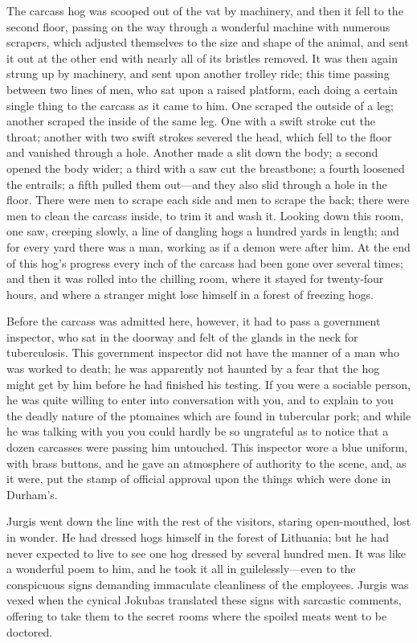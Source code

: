 \documentclass[
]{article}
\begin{document}
The carcass hog was scooped out of the vat by machinery, and then it fell to the second floor, passing on the way through a wonderful machine with numerous scrapers, which adjusted themselves to the size and shape of the animal, and sent it out at the other end with nearly all of its bristles removed. It was then again strung up by machinery, and sent upon another trolley ride; this time passing between two lines of men, who sat upon a raised platform, each doing a certain single thing to the carcass as it came to him. One scraped the outside of a leg; another scraped the inside of the same leg. One with a swift stroke cut the throat; another with two swift strokes severed the head, which fell to the floor and vanished through a hole. Another made a slit down the body; a second opened the body wider; a third with a saw cut the breastbone; a fourth loosened the entrails; a fifth pulled them out---and they also slid through a hole in the floor. There were men to scrape each side and men to scrape the back; there were men to clean the carcass inside, to trim it and wash it. Looking down this room, one saw, creeping slowly, a line of dangling hogs a hundred yards in length; and for every yard there was a man, working as if a demon were after him. At the end of this hog's progress every inch of the carcass had been gone over several times; and then it was rolled into the chilling room, where it stayed for twenty-four hours, and where a stranger might lose himself in a forest of freezing hogs.

Before the carcass was admitted here, however, it had to pass a government inspector, who sat in the doorway and felt of the glands in the neck for tuberculosis. This government inspector did not have the manner of a man who was worked to death; he was apparently not haunted by a fear that the hog might get by him before he had finished his testing. If you were a sociable person, he was quite willing to enter into conversation with you, and to explain to you the deadly nature of the ptomaines which are found in tubercular pork; and while he was talking with you you could hardly be so ungrateful as to notice that a dozen carcasses were passing him untouched. This inspector wore a blue uniform, with brass buttons, and he gave an atmosphere of authority to the scene, and, as it were, put the stamp of official approval upon the things which were done in Durham's.

Jurgis went down the line with the rest of the visitors, staring open-mouthed, lost in wonder. He had dressed hogs himself in the forest of Lithuania; but he had never expected to live to see one hog dressed by several hundred men. It was like a wonderful poem to him, and he took it all in guilelessly---even to the conspicuous signs demanding immaculate cleanliness of the employees. Jurgis was vexed when the cynical Jokubas translated these signs with sarcastic comments, offering to take them to the secret rooms where the spoiled meats went to be doctored.
\end{document}

